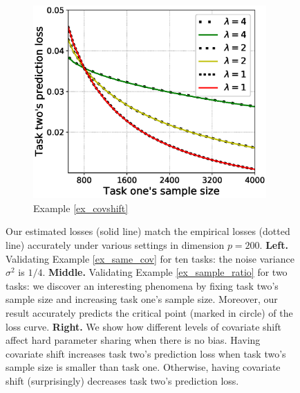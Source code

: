 \begin{figure}[!t]
	\begin{subfigure}[b]{0.33\textwidth}
		\centering
		\includegraphics[width=0.98\textwidth]{figures/covariate_shift.eps}
		\caption{Example \ref{ex_covshift}}
		\label{fig_covariate}
	\end{subfigure}
	\caption{%
	Our estimated losses (solid line) match the empirical losses (dotted line) accurately under various settings in dimension $p = 200$.
	\textbf{Left.} Validating Example \ref{ex_same_cov} for ten tasks: the noise variance $\sigma^2$ is $1/4$.
	\textbf{Middle.} Validating Example \ref{ex_sample_ratio} for two tasks: we discover an interesting phenomena by fixing task two's sample size and increasing task one's sample size.
	Moreover, our result accurately predicts the critical point (marked in circle) of the loss curve.
	\textbf{Right.} We show how different levels of covariate shift affect hard parameter sharing when there is no bias.
	Having covariate shift increases task two's prediction loss when task two's sample size is smaller than task one. Otherwise, having covariate shift (surprisingly) decreases task two's prediction loss.}
	\label{fig_model_shift_phasetrans}
\end{figure}



